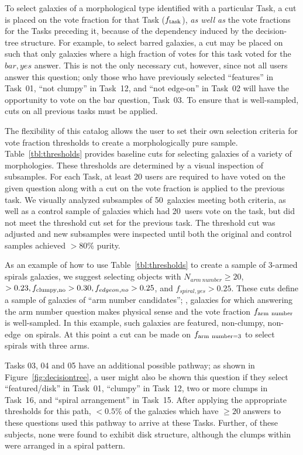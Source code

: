 \documentclass[twocolumn]{aastex6}
\begin{document}
To select galaxies of a morphological type identified with a particular Task, a cut is placed on the vote fraction for that Task ($f_{\rm task}$), \emph{as well as} the vote fractions for the Tasks preceding it, because of the dependency induced by the decision-tree structure. For example, to select barred galaxies, a cut may be placed on \fbar{} such that only galaxies where a high fraction of votes for this task voted for the $bar,yes$ answer. This is not the only necessary cut, however, since not all users answer this question; only those who have previously selected ``features'' in Task~01, ``not clumpy'' in Task~12, and ``not edge-on'' in Task~02 will have the opportunity to vote on the bar question, Task~03. To ensure that \fbar{} is well-sampled, cuts on all previous tasks must be applied. 

The flexibility of this catalog allows the user to set their own selection criteria for vote fraction thresholds to create a morphologically pure sample. Table~\ref{tbl:thresholds} provides baseline cuts for selecting galaxies of a variety of morphologies. These thresholds are determined by a visual inspection of subsamples. For each Task, at least 20 users are required to have voted on the given question along with a cut on the vote fraction is applied to the previous task. We visually analyzed subsamples of 50~galaxies meeting both criteria, as well as a control sample of galaxies which had 20~users vote on the task, but did not meet the threshold cut set for the previous task. The threshold cut was adjusted and new subsamples were inspected until both the original and control samples achieved $>80\%$ purity.

As an example of how to use Table~\ref{tbl:thresholds} to create a sample of 3-armed spirals galaxies, we suggest selecting objects with $N_{arm~number} \ge 20$, \ffeatures$>0.23, f_{\rm clumpy,no} > 0.30, f_{edgeon,no}>0.25$, and $f_{spiral,yes}>0.25$. These cuts define a sample of galaxies of ``arm number candidates''; \ie, galaxies for which answering the arm number question makes physical sense and the vote fraction $f_{\rm arm~number}$ is well-sampled. In this example, such galaxies are featured, non-clumpy, non-edge~on spirals. At this point a cut can be made on $f_{\rm arm~number=3}$ to select spirals with three arms. 

Tasks 03, 04 and 05 have an additional possible pathway; as shown in Figure~\ref{fig:decisiontree}, a user might also be shown this question if they select ``featured/disk'' in Task~01, ``clumpy'' in Task~12, two or more clumps in Task~16, and ``spiral arrangement'' in Task~15. After applying the appropriate thresholds for this path, $< 0.5\%$ of the galaxies which have $\ge 20$ answers to these questions used this pathway to arrive at these Tasks. Further, of these subjects, none were found to exhibit disk structure, although the clumps within were arranged in a spiral pattern. 
\end{document}
